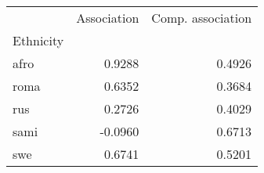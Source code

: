 \begin{tabular}{lrr}
\toprule
{} &  Association &  Comp. association \\
Ethnicity &              &                    \\
\midrule
afro      &       0.9288 &             0.4926 \\
roma      &       0.6352 &             0.3684 \\
rus       &       0.2726 &             0.4029 \\
sami      &      -0.0960 &             0.6713 \\
swe       &       0.6741 &             0.5201 \\
\bottomrule
\end{tabular}
